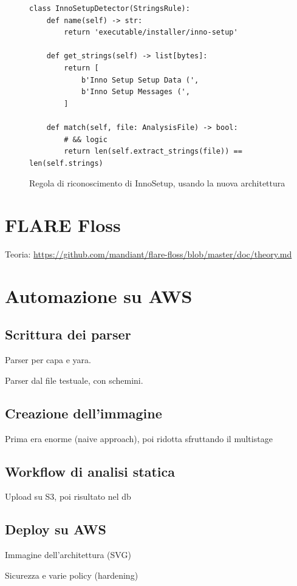 \begin{figure}[h!]
    \centering
    \begin{verbatim}
class InnoSetupDetector(StringsRule):
    def name(self) -> str:
        return 'executable/installer/inno-setup'

    def get_strings(self) -> list[bytes]:
        return [
            b'Inno Setup Setup Data (',
            b'Inno Setup Messages (',
        ]

    def match(self, file: AnalysisFile) -> bool:
        # && logic
        return len(self.extract_strings(file)) == len(self.strings)
    \end{verbatim}
    \caption{Regola di riconoscimento di InnoSetup, usando la nuova architettura}
    \label{fig:enter-label}
\end{figure}

\section{FLARE Floss}
Teoria: \url{https://github.com/mandiant/flare-floss/blob/master/doc/theory.md}

\section{Automazione su AWS}
\subsection{Scrittura dei parser}
Parser per capa e yara.

Parser dal file testuale, con schemini.


\subsection{Creazione dell'immagine}
Prima era enorme (naive approach), poi ridotta sfruttando il multistage

\subsection{Workflow di analisi statica}
Upload su S3, poi risultato nel db

\subsection{Deploy su AWS}
Immagine dell'architettura (SVG)

Sicurezza e varie policy (hardening)
